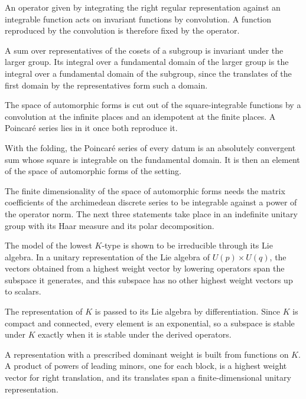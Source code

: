 An operator given by integrating the right regular representation against an integrable function
acts on invariant functions by convolution. A function reproduced by the convolution is therefore fixed
by the operator.

A sum over representatives of the cosets of a subgroup is invariant under the larger group. Its integral
over a fundamental domain of the larger group is the integral over a fundamental domain of the subgroup,
since the translates of the first domain by the representatives form such a domain.

The space of automorphic forms is cut out of the square-integrable functions by a convolution at the
infinite places and an idempotent at the finite places. A Poincaré series lies in it once both
reproduce it.

With the folding, the Poincaré series of every datum is an absolutely
convergent sum whose square is integrable on the fundamental domain. It is then
an element of the space of automorphic forms of the setting.

The finite dimensionality of the space of automorphic forms needs the matrix coefficients of the
archimedean discrete series to be integrable against a power of the operator norm. The next three
statements take place in an indefinite unitary group with its Haar measure and its polar
decomposition.

The model of the lowest $K$-type is shown to be irreducible through its Lie algebra. In a unitary
representation of the Lie algebra of $U(p)\times U(q)$, the vectors obtained from a highest weight
vector by lowering operators span the subspace it generates, and this subspace has no other highest
weight vectors up to scalars.

The representation of $K$ is passed to its Lie algebra by differentiation. Since $K$ is compact and
connected, every element is an exponential, so a subspace is stable under $K$ exactly when it is stable
under the derived operators.

A representation with a prescribed dominant weight is built from functions on $K$. A product of
powers of leading minors, one for each block, is a highest weight vector for right translation, and
its translates span a finite-dimensional unitary representation.

